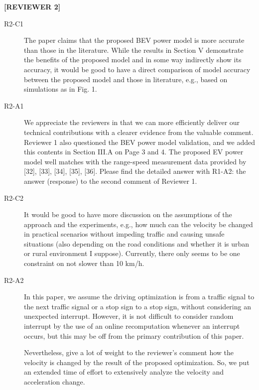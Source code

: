 \documentclass[onecolumn]{IEEEconf}
\begin{document}
\textbf{[REVIEWER 2]}
\begin{description}

\item [R2-C1] The paper claims that the proposed BEV power model is more accurate than those in the literature. While the results in Section V demonstrate the benefits of the proposed model and in some way indirectly show its accuracy, it would be good to have a direct comparison of model accuracy between the proposed model and those in literature, e.g., based on simulations as in Fig. 1. 

\item [R2-A1] We appreciate the reviewers in that we can more efficiently deliver our technical contributions with a clearer evidence from the valuable comment. Reviewer 1 also questioned the BEV power model validation, and we added this contents in Section III.A on Page 3 and 4. The proposed EV power model well matches with the range-speed measurement  data provided by [32], [33], [34], [35], [36]. Please find the detailed answer with R1-A2: the answer (response) to the second comment of Reviewer 1.

\item [R2-C2] It would be good to have more discussion on the assumptions of the approach and the experiments, e.g., how much can the velocity be changed in practical scenarios without impeding traffic and causing unsafe situations (also depending on the road conditions and whether it is urban or rural environment I suppose). Currently, there only seems to be one constraint on not slower than 10 km/h. 

\item [R2-A2] In this paper, we assume the driving optimization is from a traffic signal to the next traffic signal or a stop sign to a stop sign, without considering an unexpected interrupt. However, it is not difficult to consider random interrupt by the use of an online recomputation whenever an interrupt occurs, but this may be off from the primary contribution of this paper. 

Nevertheless, give a lot of weight to the reviewer’s comment how the velocity is changed by the result of the proposed optimization. So, we put an extended time of effort to extensively analyze the velocity and acceleration change.


\end{description}
\end{document}
